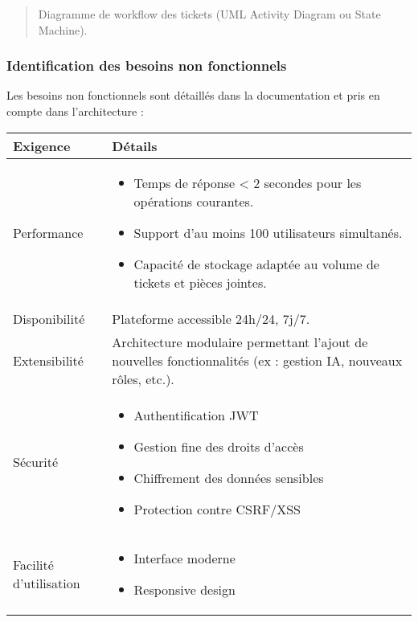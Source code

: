 \begin{quote}
    Diagramme de workflow des tickets (UML Activity Diagram ou State Machine).
\end{quote}

\subsubsection{Identification des besoins non fonctionnels}
\label{sec:identification-des-besoins-non-fonctionnels}
Les besoins non fonctionnels sont détaillés dans la documentation et pris en compte dans l'architecture :

\renewcommand{\arraystretch}{1.2}
\begin{table}[htbp]
    \centering
    \setlength{\tabcolsep}{6pt}
    \begin{tabular}{|p{2.5cm}|p{12cm}|}
        \hline
        \textbf{Exigence} & \textbf{Détails} \\
        \hline
        Performance & 
        \begin{itemize}
            \item Temps de réponse < 2 secondes pour les opérations courantes.
            \item Support d'au moins 100 utilisateurs simultanés.
            \item Capacité de stockage adaptée au volume de tickets et pièces jointes.
        \end{itemize} \\
        \hline
        Disponibilité & Plateforme accessible 24h/24, 7j/7. \\
        \hline
        Extensibilité & Architecture modulaire permettant l'ajout de nouvelles fonctionnalités (ex : gestion IA, nouveaux rôles, etc.). \\
        \hline
        Sécurité & 
        \begin{itemize}
            \item Authentification JWT
            \item Gestion fine des droits d'accès
            \item Chiffrement des données sensibles
            \item Protection contre CSRF/XSS
        \end{itemize} \\
        \hline
        Facilité d'utilisation & 
        \begin{itemize}
            \item Interface moderne
            \item Responsive design

\end{itemize}
\end{tabular}
\end{table}
